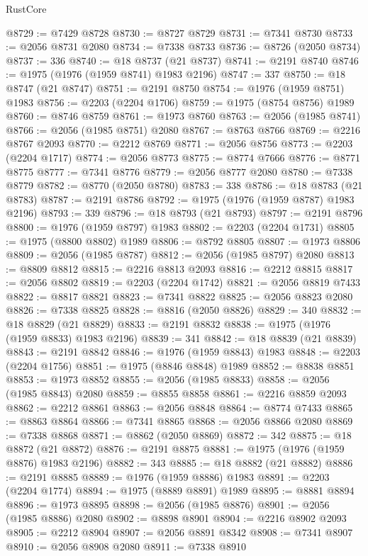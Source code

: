 \begin{lexlean}{RustCore}
\begin{coremodule}
@8729 := @7429 @8728
@8730 := @8727 @8729
@8731 := @7341 @8730
@8733 := @2056 @8731 @2080
@8734 := @7338 @8733
@8736 := @8726 (@2050 @8734)
@8737 := 336
@8740 := @18 @8737 (@21 @8737)
@8741 := @2191 @8740
@8746 := @1975 (@1976 (@1959 @8741) @1983 @2196)
@8747 := 337
@8750 := @18 @8747 (@21 @8747)
@8751 := @2191 @8750
@8754 := @1976 (@1959 @8751) @1983
@8756 := @2203 (@2204 @1706)
@8759 := @1975 (@8754 @8756) @1989
@8760 := @8746 @8759
@8761 := @1973 @8760
@8763 := @2056 (@1985 @8741)
@8766 := @2056 (@1985 @8751) @2080
@8767 := @8763 @8766
@8769 := @2216 @8767 @2093
@8770 := @2212 @8769
@8771 := @2056 @8756
@8773 := @2203 (@2204 @1717)
@8774 := @2056 @8773
@8775 := @8774 @7666
@8776 := @8771 @8775
@8777 := @7341 @8776
@8779 := @2056 @8777 @2080
@8780 := @7338 @8779
@8782 := @8770 (@2050 @8780)
@8783 := 338
@8786 := @18 @8783 (@21 @8783)
@8787 := @2191 @8786
@8792 := @1975 (@1976 (@1959 @8787) @1983 @2196)
@8793 := 339
@8796 := @18 @8793 (@21 @8793)
@8797 := @2191 @8796
@8800 := @1976 (@1959 @8797) @1983
@8802 := @2203 (@2204 @1731)
@8805 := @1975 (@8800 @8802) @1989
@8806 := @8792 @8805
@8807 := @1973 @8806
@8809 := @2056 (@1985 @8787)
@8812 := @2056 (@1985 @8797) @2080
@8813 := @8809 @8812
@8815 := @2216 @8813 @2093
@8816 := @2212 @8815
@8817 := @2056 @8802
@8819 := @2203 (@2204 @1742)
@8821 := @2056 @8819 @7433
@8822 := @8817 @8821
@8823 := @7341 @8822
@8825 := @2056 @8823 @2080
@8826 := @7338 @8825
@8828 := @8816 (@2050 @8826)
@8829 := 340
@8832 := @18 @8829 (@21 @8829)
@8833 := @2191 @8832
@8838 := @1975 (@1976 (@1959 @8833) @1983 @2196)
@8839 := 341
@8842 := @18 @8839 (@21 @8839)
@8843 := @2191 @8842
@8846 := @1976 (@1959 @8843) @1983
@8848 := @2203 (@2204 @1756)
@8851 := @1975 (@8846 @8848) @1989
@8852 := @8838 @8851
@8853 := @1973 @8852
@8855 := @2056 (@1985 @8833)
@8858 := @2056 (@1985 @8843) @2080
@8859 := @8855 @8858
@8861 := @2216 @8859 @2093
@8862 := @2212 @8861
@8863 := @2056 @8848
@8864 := @8774 @7433
@8865 := @8863 @8864
@8866 := @7341 @8865
@8868 := @2056 @8866 @2080
@8869 := @7338 @8868
@8871 := @8862 (@2050 @8869)
@8872 := 342
@8875 := @18 @8872 (@21 @8872)
@8876 := @2191 @8875
@8881 := @1975 (@1976 (@1959 @8876) @1983 @2196)
@8882 := 343
@8885 := @18 @8882 (@21 @8882)
@8886 := @2191 @8885
@8889 := @1976 (@1959 @8886) @1983
@8891 := @2203 (@2204 @1774)
@8894 := @1975 (@8889 @8891) @1989
@8895 := @8881 @8894
@8896 := @1973 @8895
@8898 := @2056 (@1985 @8876)
@8901 := @2056 (@1985 @8886) @2080
@8902 := @8898 @8901
@8904 := @2216 @8902 @2093
@8905 := @2212 @8904
@8907 := @2056 @8891 @8342
@8908 := @7341 @8907
@8910 := @2056 @8908 @2080
@8911 := @7338 @8910

\end{coremodule}
\end{lexlean}
